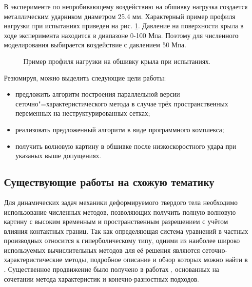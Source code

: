 В эксперименте по непробивающему воздействию на обшивку нагрузка создается 
металлическим ударником диаметром 25.4 мм. Характерный пример профиля нагрузки 
при испытаниях приведен на рис. \ref{pic:loadprofile}. Давление на поверхности 
крыла в ходе эксперимента находится в диапазоне 0-100 Мпа. Поэтому для численного 
моделирования выбирается воздействие с давлением 50 Мпа.
\begin{figure}[h]
\caption{Пример профиля нагрузки на обшивку крыла при испытаниях.}
\label{pic:loadprofile}
\end{figure}

Резюмируя, можно выделить следующие цели работы:
\begin{itemize}
\item предложить алгоритм построения параллельной версии сеточно"=характеристического метода в случае трёх пространственных переменных на неструктурированных сетках;
\item реализовать предложенный алгоритм в виде программного комплекса;
\item получить волновую картину в обшивке после низкоскоростного удара при
указаных выше допущениях.
\end{itemize}

\subsection*{Существующие работы на схожую тематику}

Для динамических задач механики деформируемого твердого тела необходимо использование численных методов, позволяющих получить полную волновую картину с высоким временным и пространственным разрешением с учётом влияния контактных границ. Так как определяющая система уравнений в частных производных относится к гиперболическому типу, одними из наиболее широко используемых вычислительных методов для её решения являются сеточно-характеристические методы, подробное описание и обзор которых можно найти в \cite{magomedov}. Существенное продвижение было получено в работах \cite{chushkin}, основанных на сочетании метода характеристик и конечно-разностных подходов.

